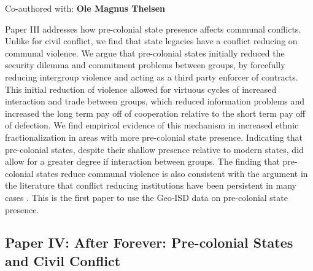 Co-authored with: \textbf{Ole Magnus Theisen}

Paper III addresses how pre-colonial state presence affects communal conflicts.
Unlike for civil conflict, we find that state legacies have a conflict reducing
on communal violence. We argue that pre-colonial states initially reduced the
security dilemma and commitment problems between groups, by forcefully reducing
intergroup violence and acting as a third party enforcer of contracts. This
initial reduction of violence allowed for virtuous cycles of increased
interaction and trade between groups, which reduced information problems and
increased the long term pay off of cooperation relative to the short term pay
off of defection. We find empirical evidence of this mechanism in increased
ethnic fractionalization in areas with more pre-colonial state presence.
Indicating that pre-colonial states, despite their shallow presence relative to
modern states, did allow for a greater degree if interaction between groups. The
finding that pre-colonial states reduce communal violence is also consistent
with the argument in the literature that conflict reducing institutions have
been persistent in many cases \citep{Wig2018}. This is the first paper to use
the Geo-ISD data on pre-colonial state presence.

\subsection{Paper IV: After Forever: Pre-colonial States and Civil Conflict}
\label{Paper 4}

